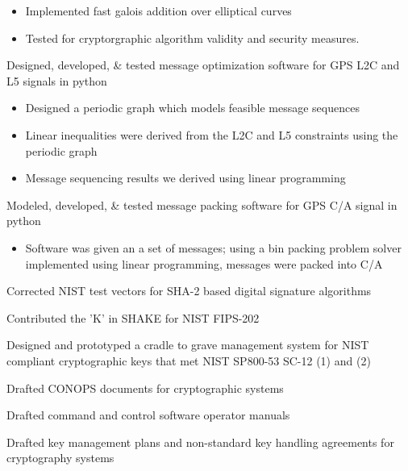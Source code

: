 \documentclass[letterpaper]{clinton-resume}
\begin{document}
\begin{minipage}[t]{0.66\textwidth}
\begin{tightitemize}
\begin{itemize}
\item  Implemented fast galois addition over elliptical curves
\item Tested for cryptorgraphic algorithm validity and security measures.
\end{itemize}
\item Designed, developed, \& tested message optimization software for GPS L2C and L5 signals in python
\begin{itemize}
\item Designed a periodic graph which models feasible message sequences
\item Linear inequalities were derived from the L2C and L5 constraints using the periodic graph
\item Message sequencing results we derived using linear programming
\end{itemize}
\item Modeled, developed, \& tested message packing software for GPS C/A signal in python
\begin{itemize}
\item Software was given an a set of messages; using a bin packing problem solver implemented using linear programming, messages were packed into C/A
\end{itemize}
\item Corrected NIST test vectors for SHA-2 based digital signature algorithms
\item Contributed the 'K' in SHAKE for NIST FIPS-202
\item Designed and prototyped a cradle to grave management system for NIST compliant cryptographic keys that met NIST SP800-53 SC-12 (1) and (2)
\item Drafted CONOPS documents for cryptographic systems
\item Drafted command and control software operator manuals
\item Drafted key management plans and non-standard key handling agreements for cryptography systems
\end{tightitemize}
\sectionspace




\end{minipage}
\newpage
\begin{minipage}[t]{0.33\textwidth}
\hspace{0.33\textwidth}
\end{minipage}
\end{document}
